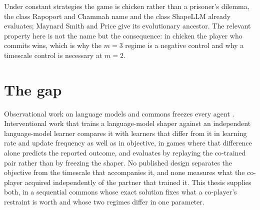 Under constant strategies the game is chicken rather than a prisoner's
dilemma, the class Rapoport and Chammah \cite{rapoport1966} name and the
class ShapeLLM already evaluates; Maynard Smith and Price
\cite{maynardsmith1973} give its evolutionary ancestor.
The relevant property here is not the name but the consequence: in chicken
the player who commits wins, which is why the \(m=3\) regime is a negative
control and why a timescale control is necessary at \(m=2\).

\section{The gap}
\label{sec:lit-gap}

Observational work on language models and commons freezes every agent
\cite{piatti2024,akata2025}.
Interventional work that trains a language-model shaper against an
independent language-model learner \cite{garciasegura2025} compares it with
learners that differ from it in learning rate and update frequency as well
as in objective, in games where that difference alone predicts the reported
outcome, and evaluates by replaying the co-trained pair rather than by
freezing the shaper.
No published design separates the objective from the timescale that
accompanies it, and none measures what the co-player acquired independently
of the partner that trained it.
This thesis supplies both, in a sequential commons whose exact solution
fixes what a co-player's restraint is worth and whose two regimes differ in
one parameter.
